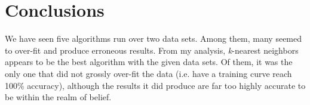 \section{Conclusions}

We have seen five algorithms run over two data sets. Among them, many seemed to over-fit and produce erroneous results. From my analysis, \textit{k}-nearest neighbors appears to be the best algorithm with the given data sets. Of them, it was the only one that did not grossly over-fit the data (i.e. have a training curve reach 100\% accuracy), although the results it did produce are far too highly accurate to be within the realm of belief.